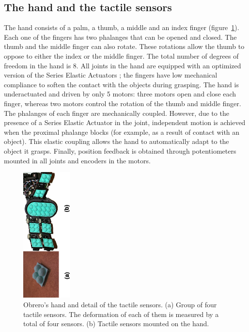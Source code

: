 \subsection{The hand and the tactile sensors}
%
The hand consists of a palm, a thumb, a middle and an index
finger (figure~\ref{fig:TactileSensors}). Each one of the fingers 
has two phalanges that can be opened and closed. The thumb and the middle finger can also
rotate. These rotations allow the thumb to oppose to either the
index or the middle finger. The total number of degrees of freedom
in the hand is 8. All joints in the hand are equipped with an
optimized version of the Series Elastic Actuators \cite{actuator};
the fingers have low mechanical compliance to soften the contact
with the objects during grasping.
The hand is underactuated and driven by only 5 motors:
three motors open and close each finger, whereas two motors
control the rotation of the thumb and middle finger. The
phalanges of each finger are mechanically coupled. However, due to the
presence of a Series Elastic Actuator in the joint, independent
motion is achieved when the proximal phalange blocks (for example,
as a result of contact with an object). This elastic coupling
allows the hand to automatically adapt to the object it grasps.
Finally, position feedback is obtained through potentiometers
mounted in all joints and encoders in the motors.
%
%
\begin{figure}[tbp]
\centerline{
\includegraphics[width=1.0in, angle=270 ]{./figures/Tactiles.eps}
} \caption{Obrero's hand and detail of the tactile sensors. (a) Group of four tactile sensors. The
deformation of each of them is measured by a total of four sensors.
(b) Tactile sensors mounted on the hand.} \label{fig:TactileSensors}
\end{figure}

